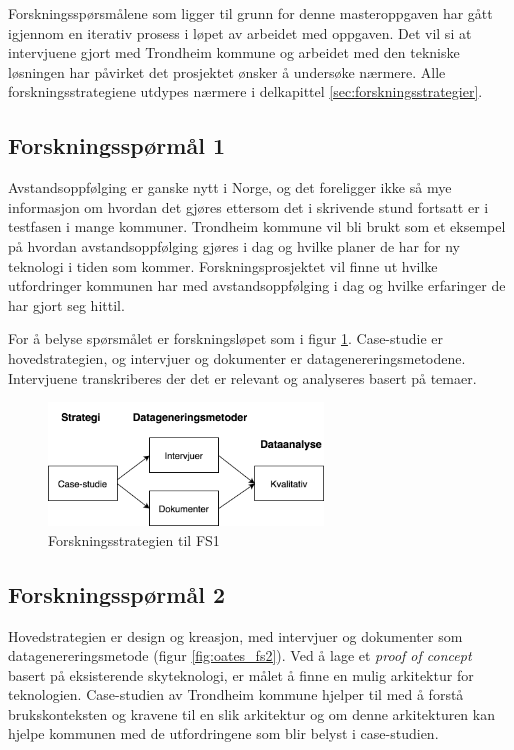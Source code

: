 Forskningsspørsmålene som ligger til grunn for denne masteroppgaven har gått igjennom en iterativ prosess i løpet av arbeidet
med oppgaven. Det vil si at intervjuene gjort med Trondheim kommune og arbeidet med den tekniske løsningen har påvirket
det prosjektet ønsker å undersøke nærmere. Alle forskningsstrategiene utdypes nærmere i delkapittel \ref{sec:forskningsstrategier}.

\subsection{Forskningsspørmål 1}
\textbf{}

Avstandsoppfølging er ganske nytt i Norge, og det foreligger ikke så mye informasjon om hvordan det gjøres ettersom
det i skrivende stund fortsatt er i testfasen i mange kommuner. Trondheim kommune vil bli brukt som et eksempel på hvordan avstandsoppfølging
gjøres i dag og hvilke planer de har for ny teknologi i tiden som kommer. Forskningsprosjektet vil finne ut hvilke utfordringer
kommunen har med avstandsoppfølging i dag og hvilke erfaringer de har gjort seg hittil.

For å belyse spørsmålet er forskningsløpet som i figur \ref{fig:oates_fs1}. Case-studie er hovedstrategien, og intervjuer og dokumenter
er datagenereringsmetodene. Intervjuene transkriberes der det er relevant og analyseres basert på temaer.

\begin{figure}
\centering
\includegraphics[width=0.65\textwidth]{fig/oates/fs1}
\caption{Forskningsstrategien til FS1}
\label{fig:oates_fs1}
\end{figure}

\subsection{Forskningsspørmål 2}
\textbf{}

Hovedstrategien er design og kreasjon, med intervjuer og dokumenter som datagenereringsmetode (figur \ref{fig:oates_fs2}). Ved å lage
et \textit{proof of concept} basert på eksisterende skyteknologi, er målet å finne en mulig arkitektur for teknologien. Case-studien av Trondheim
kommune hjelper til med å forstå brukskonteksten og kravene til en slik arkitektur og om denne arkitekturen kan hjelpe kommunen med de
utfordringene som blir belyst i case-studien.

